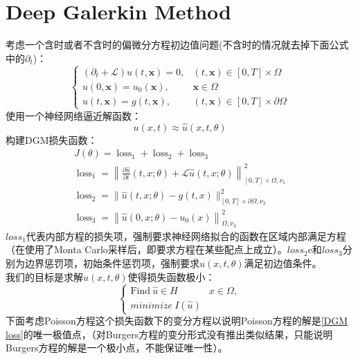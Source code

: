 \documentclass{article}
\begin{document}
\section{Deep Galerkin Method}
考虑一个含时或者不含时的偏微分方程初边值问题(不含时的情况就去掉下面公式中的$\partial_t$)：
\begin{equation}
\left\{\begin{array}{ll}\left(\partial_{t}+\mathcal{L}\right) u(t, \boldsymbol{x})=0, & (t, \boldsymbol{x}) \in[0, T] \times \Omega \\ u(0, \boldsymbol{x})=u_{0}(\boldsymbol{x}), & \boldsymbol{x} \in \Omega \\ u(t, \boldsymbol{x})=g(t, \boldsymbol{x}), & (t, \boldsymbol{x}) \in[0, T] \times \partial \Omega\end{array}\right.
\end{equation}
使用一个神经网络逼近解函数：
\begin{equation}\label{approximation}
u(x,t) \approx \hat{u}(x,t,\theta)
\end{equation}
构建DGM损失函数：
\begin{equation}\label{DGM loss}
\begin{array}{l}
J(\theta)=\operatorname{loss}_{1}+\operatorname{loss}_{2}+\operatorname{loss}_{3}\\
\operatorname{loss}_{1}=\left\|\frac{\partial \hat{u}}{\partial t}(t, x ; \theta)+\mathcal{L} \hat{u}(t, x ; \theta)\right\|_{[0, T] \times \Omega, \nu_{1}}^{2}\\
\operatorname{loss}_{2}=\|\hat{u}(t, x ; \theta)-g(t, x)\|_{[0, T] \times \partial \Omega, \nu_{2}}^{2}\\
\operatorname{loss}_{3}=\left\|\hat{u}(0, x ; \theta)-u_{0}(x)\right\|_{\Omega, \nu_{3}}^{2}
\end{array}
\end{equation}
$loss_1$代表内部方程的损失项，强制要求神经网络拟合的函数在区域内部满足方程（在使用了Monta Carlo采样后，即要求方程在某些配点上成立）。$loss_2$e和$loss_3$分别为边界惩罚项，初始条件惩罚项，强制要求$\hat{u}(x,t,\theta)$满足初边值条件。\\
我们的目标是求解$\hat{u}(x,t,\theta)$使得损失函数极小：
\begin{equation}\label{minimize}
	\begin{cases}
 		\text{Find} \ \hat{u} \in H& x\in \Omega, \\
 		minimize \ I(\hat{u})
 	\end{cases}
\end{equation}
下面考虑Poisson方程这个损失函数下的变分方程以说明Poisson方程的解是\ref{DGM loss}的唯一极值点，（对Burgers方程的变分形式没有推出类似结果，只能说明Burgers方程的解是一个极小点，不能保证唯一性）。
\end{document}
